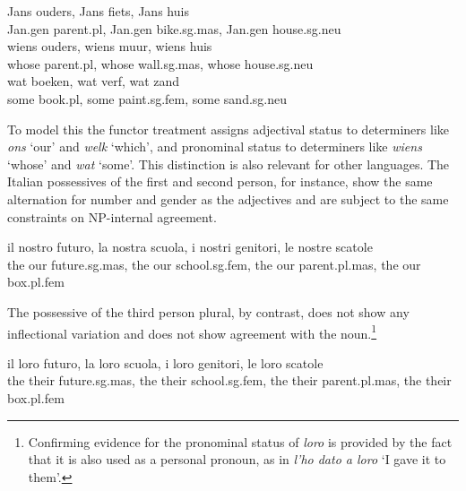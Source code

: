\documentclass[output=paper]{langsci/langscibook}
\begin{document}
\begin{exe} 
\ex\label{jans}
\gll  Jans ouders,                   Jans fiets,                      Jans huis \\ 
      Jan.{\sc gen} parent.{\sc pl}, Jan.{\sc gen} bike.{\sc sg.mas}, Jan.{\sc gen} house.{\sc sg.neu} \\
\ex\label{wiens}
\gll  wiens ouders,          wiens muur,              wiens huis \\ 
      whose parent.{\sc pl}, whose wall.{\sc sg.mas}, whose house.{\sc sg.neu} \\
\ex\label{wat}
\gll  wat boeken,         wat verf,                wat zand  \\
      some book.{\sc pl}, some paint.{\sc sg.fem}, some sand.{\sc sg.neu} \\
\end{exe} 

\noindent
To model this the functor treatment assigns adjectival status 
to determiners like \emph{ons} `our' and \emph{welk} `which', 
and pronominal status to determiners like \emph{wiens} `whose' and
\emph{wat} `some'.  
This distinction is also relevant for other languages. The Italian 
possessives of the first and second person, for instance, 
show the same alternation for number and gender as the adjectives
and are subject to the same constraints on NP-internal agreement.

\begin{exe}  
\ex 
\gll  il nostro futuro, la nostra scuola, i nostri genitori, le nostre scatole \\
      the our future.{\sc sg.mas}, the our school.{\sc sg.fem}, the our parent.{\sc pl.mas}, the our box.{\sc pl.fem} \\ 
\end{exe} 

\noindent
The possessive of the third person plural, by contrast, does not show any 
inflectional variation and does not show agreement with the 
noun.\footnote{Confirming evidence for the pronominal status of \emph{loro} is 
provided by the fact that it is also used as a personal pronoun, as in 
\emph{l'ho dato a loro} `I gave it to them'.}

\begin{exe} 
\ex 
\gll  il loro futuro, la loro scuola, i loro genitori, le loro scatole \\   
      the their future.{\sc sg.mas}, the their school.{\sc sg.fem}, the their parent.{\sc pl.mas}, the their box.{\sc pl.fem} \\ 
\end{exe}
\end{document}
